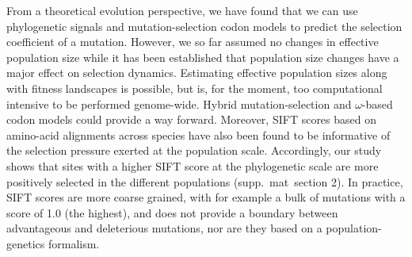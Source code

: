 \documentclass{article}
\begin{document}
    From a theoretical evolution perspective, we have found that we can use phylogenetic signals and mutation-selection codon models to predict the selection coefficient of a mutation.
    However, we so far assumed no changes in effective population size while it has been established that population size changes have a major effect on selection dynamics\cite{lanfear_population_2014, jones_shifting_2017, platt_protein_2018}.
    Estimating effective population sizes along with fitness landscapes is possible\cite{latrille_inferring_2021}, but is, for the moment, too computational intensive to be performed genome-wide\cite{latrille_inferring_2021}.
    Hybrid mutation-selection and $\omega$-based codon models could provide a way forward\cite{brevet_reconstructing_2021}.
    Moreover, SIFT scores based on amino-acid alignments across species have also been found to be informative of the selection pressure exerted at the population scale\cite{chen_hunting_2021}.
    Accordingly, our study shows that sites with a higher SIFT score at the phylogenetic scale are more positively selected in the different populations (supp.\ mat\  section 2).
    In practice, SIFT scores are more coarse grained, with for example a bulk of mutations with a score of 1.0 (the highest), and does not provide a boundary between advantageous and deleterious mutations, nor are they based on a population-genetics formalism.
\end{document}
